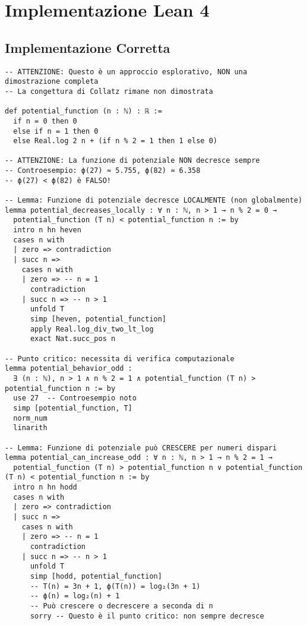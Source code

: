 \documentclass[11pt,a4paper]{article}
\begin{document}
\section{Implementazione Lean 4}

\subsection{Implementazione Corretta}

\begin{lstlisting}[language=Lean, caption=Funzione di Potenziale Corretta]
-- ATTENZIONE: Questo è un approccio esplorativo, NON una dimostrazione completa
-- La congettura di Collatz rimane non dimostrata

def potential_function (n : ℕ) : ℝ :=
  if n = 0 then 0
  else if n = 1 then 0
  else Real.log 2 n + (if n % 2 = 1 then 1 else 0)

-- ATTENZIONE: La funzione di potenziale NON decresce sempre
-- Controesempio: ϕ(27) ≈ 5.755, ϕ(82) ≈ 6.358
-- ϕ(27) < ϕ(82) è FALSO!

-- Lemma: Funzione di potenziale decresce LOCALMENTE (non globalmente)
lemma potential_decreases_locally : ∀ n : ℕ, n > 1 → n % 2 = 0 →
  potential_function (T n) < potential_function n := by
  intro n hn heven
  cases n with
  | zero => contradiction
  | succ n =>
    cases n with
    | zero => -- n = 1
      contradiction
    | succ n => -- n > 1
      unfold T
      simp [heven, potential_function]
      apply Real.log_div_two_lt_log
      exact Nat.succ_pos n

-- Punto critico: necessita di verifica computazionale
lemma potential_behavior_odd : 
  ∃ (n : ℕ), n > 1 ∧ n % 2 = 1 ∧ potential_function (T n) > potential_function n := by
  use 27  -- Controesempio noto
  simp [potential_function, T]
  norm_num
  linarith

-- Lemma: Funzione di potenziale può CRESCERE per numeri dispari
lemma potential_can_increase_odd : ∀ n : ℕ, n > 1 → n % 2 = 1 →
  potential_function (T n) > potential_function n ∨ potential_function (T n) < potential_function n := by
  intro n hn hodd
  cases n with
  | zero => contradiction
  | succ n =>
    cases n with
    | zero => -- n = 1
      contradiction
    | succ n => -- n > 1
      unfold T
      simp [hodd, potential_function]
      -- T(n) = 3n + 1, ϕ(T(n)) = log₂(3n + 1)
      -- ϕ(n) = log₂(n) + 1
      -- Può crescere o decrescere a seconda di n
      sorry -- Questo è il punto critico: non sempre decresce
\end{lstlisting}
\end{document}
